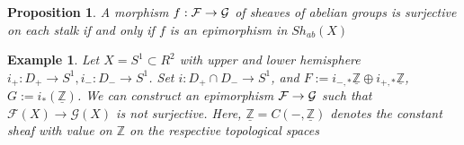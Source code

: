 \documentclass{article}
\newtheorem{example}[theorem]{Example}
\newtheorem{proposition}[theorem]{Proposition}
\begin{document}
\begin{proposition}
A morphism $f :\cal F \to \cal G$ of sheaves of abelian groups is surjective on each stalk if and
only if $f$ is an epimorphism in $Sh_{ab}(X)$
\end{proposition}

\begin{example}
Let $X = S^1 \subset R^2$ with upper and lower hemisphere $i_+ : D_+ \to S^1, i_- : D_- \to S^1$. Set $i: D_+ \cap D_- \to S^1$, and $F := i_{-,\ast}\underline {\mathbb Z} \oplus i_{+,\ast}\underline {\mathbb Z}$, $G := i_\ast(\underline {\mathbb Z})$. We can construct an epimorphism $\cal F \to \cal G$ such
that $\mathcal F(X) \to \mathcal G(X)$ is not surjective. Here, $\underline {\mathbb Z} = C(−, \underline {\mathbb Z})$ denotes the constant sheaf with value on
${\mathbb Z}$ on the respective topological spaces
\end{example}






\newpage
\end{document}
